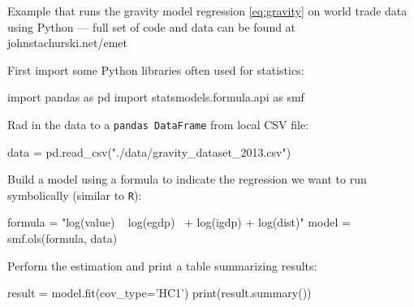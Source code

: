 \begin{frame}[fragile]

    \vspace{2em}
    Example that runs the gravity model regression \eqref{eq:gravity} on world
    trade data using Python --- full set of code and data
    can be found at johnstachurski.net/emet

    First import some Python libraries 
    often used for statistics:
    
    \begin{pythoncode}
    import pandas as pd
    import statsmodels.formula.api as smf
    \end{pythoncode}
    
    Rad in the data to a \texttt{pandas DataFrame} from local CSV
    file:
    \small 
    \begin{pythoncode}
    data  = pd.read_csv("./data/gravity_dataset_2013.csv")
    \end{pythoncode}
    
\end{frame}

\begin{frame}[fragile]

    \vspace{2em}
    Build a model using a formula to indicate the regression we want to run
    symbolically (similar to \texttt{R}):
    
    \begin{pythoncode}
    formula = "log(value) ~ log(egdp) \
                + log(igdp) + log(dist)"
    model = smf.ols(formula, data)
    \end{pythoncode}
    
    Perform the estimation and print a table summarizing results:

    \begin{pythoncode}
    result = model.fit(cov_type='HC1')
    print(result.summary())
    \end{pythoncode}

\end{frame}

